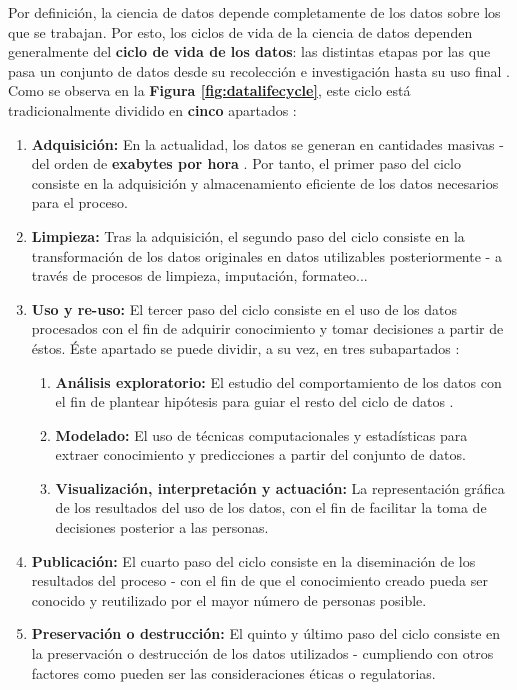 Por definición, la ciencia de datos depende completamente de los datos sobre los que se trabajan. Por esto, los ciclos de vida de la ciencia de datos dependen generalmente del \textbf{ciclo de vida de los datos}: las distintas etapas por las que pasa un conjunto de datos desde su recolección e investigación hasta su uso final \cite{datasciencelifecycle}. Como se observa en la \textbf{Figura \ref{fig:datalifecycle}}, este ciclo está tradicionalmente dividido en \textbf{cinco} apartados \cite{potential}:

\begin{enumerate}
	\item \textbf{Adquisición:} En la actualidad, los datos se generan en cantidades masivas - del orden de \textbf{exabytes por hora} \cite{Wing2019Data}. Por tanto, el primer paso del ciclo consiste en la adquisición y almacenamiento eficiente de los datos necesarios para el proceso.
	\item \textbf{Limpieza:} Tras la adquisición, el segundo paso del ciclo consiste en la transformación de los datos originales en datos utilizables posteriormente - a través de procesos de limpieza, imputación, formateo...
	\item \textbf{Uso y re-uso:}  El tercer paso del ciclo consiste en el uso de los datos procesados con el fin de adquirir conocimiento y tomar decisiones a partir de éstos. Éste apartado se puede dividir, a su vez, en tres subapartados \cite{Wing2019Data}:
		\begin{enumerate}
			\item \textbf{Análisis exploratorio:} El estudio del comportamiento de los datos con el fin de plantear hipótesis para guiar el resto del ciclo de datos \cite{eda}.
			\item \textbf{Modelado:} El uso de técnicas computacionales y estadísticas para extraer conocimiento y predicciones a partir del conjunto de datos.
			\item \textbf{Visualización, interpretación y actuación:}  La representación gráfica de los resultados del uso de los datos, con el fin de facilitar la toma de decisiones posterior a las personas.
		\end{enumerate}
	\item \textbf{Publicación:} El cuarto paso del ciclo consiste en la diseminación de los resultados del proceso - con el fin de que el conocimiento creado pueda ser conocido y reutilizado por el mayor número de personas posible.
	\item \textbf{Preservación o destrucción:} El quinto y último paso del ciclo consiste en la preservación o destrucción de los datos utilizados - cumpliendo con otros factores como pueden ser las consideraciones éticas o regulatorias.
\end{enumerate}



